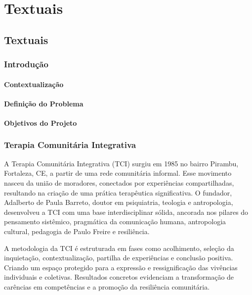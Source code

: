 \part{Textuais}

\chapter[Textuais]{Textuais}

\section{Introdução}
\subsection{Contextualização}
\subsection{Definição do Problema}
\subsection{Objetivos do Projeto}

\section{Terapia Comunitária Integrativa}

A Terapia Comunitária Integrativa (TCI) surgiu em 1985 no bairro Pirambu, Fortaleza, CE, a partir de uma rede comunitária informal. Esse movimento nasceu da união de moradores, conectados por experiências compartilhadas, resultando na criação de uma prática terapêutica significativa. O fundador, Adalberto de Paula Barreto, doutor em psiquiatria, teologia e antropologia, desenvolveu a TCI com uma base interdisciplinar sólida, ancorada nos pilares do pensamento sistêmico, pragmática da comunicação humana, antropologia cultural, pedagogia de Paulo Freire e resiliência.\cite{BARRETO}

A metodologia da TCI é estruturada em fases como acolhimento, seleção da inquietação, contextualização, partilha de experiências e conclusão positiva. Criando um espaço protegido para a expressão e ressignificação das vivências individuais e coletivas. Resultados concretos evidenciam a transformação de carências em competências e a promoção da resiliência comunitária. \cite{SILVA}

